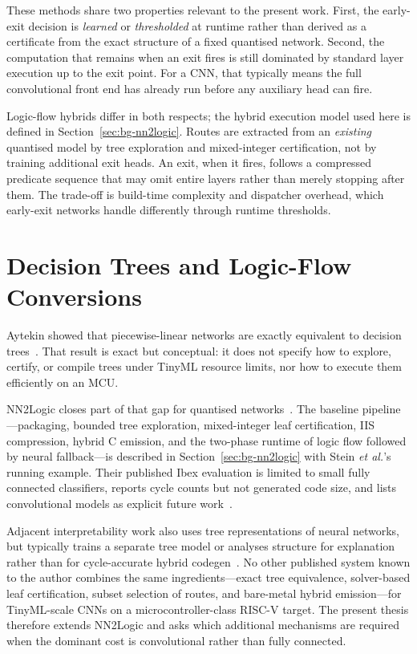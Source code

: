 These methods share two properties relevant to the present work.
First, the early-exit decision is \emph{learned} or \emph{thresholded} at runtime rather than derived as a certificate from the exact structure of a fixed quantised network.
Second, the computation that remains when an exit fires is still dominated by standard layer execution up to the exit point.
For a \ac{CNN}, that typically means the full convolutional front end has already run before any auxiliary head can fire.

Logic-flow hybrids differ in both respects; the hybrid execution model used here is defined in Section~\ref{sec:bg-nn2logic}.
Routes are extracted from an \emph{existing} quantised model by tree exploration and mixed-integer certification, not by training additional exit heads.
An exit, when it fires, follows a compressed predicate sequence that may omit entire layers rather than merely stopping after them.
The trade-off is build-time complexity and dispatcher overhead, which early-exit networks handle differently through runtime thresholds.


\section{Decision Trees and Logic-Flow Conversions}
\label{sec:rw-trees}

Aytekin showed that piecewise-linear networks are exactly equivalent to decision trees~\cite{aytekin2022nns}.
That result is exact but conceptual: it does not specify how to explore, certify, or compile trees under TinyML resource limits, nor how to execute them efficiently on an \ac{MCU}.

NN2Logic closes part of that gap for quantised networks~\cite{stein2026nn2logic}.
The baseline pipeline---packaging, bounded tree exploration, mixed-integer leaf certification, \ac{IIS} compression, hybrid C emission, and the two-phase runtime of logic flow followed by neural fallback---is described in Section~\ref{sec:bg-nn2logic} with Stein \textit{et al.}'s running example.
Their published Ibex evaluation is limited to small fully connected classifiers, reports cycle counts but not generated code size, and lists convolutional models as explicit future work~\cite{stein2026nn2logic}.

Adjacent interpretability work also uses tree representations of neural networks, but typically trains a separate tree model or analyses structure for explanation rather than for cycle-accurate hybrid codegen~\cite{aytekin2022nns}.
No other published system known to the author combines the same ingredients---exact tree equivalence, solver-based leaf certification, subset selection of routes, and bare-metal hybrid emission---for TinyML-scale \acp{CNN} on a microcontroller-class \mbox{RISC-V} target.
The present thesis therefore extends NN2Logic and asks which additional mechanisms are required when the dominant cost is convolutional rather than fully connected.


